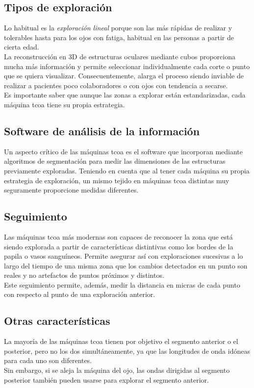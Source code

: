 \subsection{Tipos de exploración}
Lo habitual es la \emph{exploración lineal} porque son las más rápidas
de realizar y tolerables hasta para los ojos con
fatiga, habitual en las personas a partir de cierta edad.\\
La reconstrucción en 3D de estructuras oculares mediante cubos
proporciona mucha más información y permite seleccionar
individualmente cada corte o punto que se quiera
visualizar. Consecuentemente, alarga el proceso siendo inviable de
realizar a pacientes poco colaboradores o con ojos con tendencia a
secarse.\\
Es importante saber que aunque las zonas a explorar están estandarizadas, cada máquina
\gls{tcoa} tiene su propia estrategia.

\subsection{Software de análisis de la información}
Un aspecto crítico de las máquinas \gls{tcoa} es el software que
incorporan mediante algoritmos de segmentación para medir las
dimensiones de las estructuras previamente exploradas. Teniendo en
cuenta que al tener cada máquina su propia estrategia de exploración,
un mismo tejido en máquinas \gls{tcoa} distintas muy seguramente proporcione
medidas diferentes.

\subsection{Seguimiento}
Las máquinas \gls{tcoa} más modernas son capaces de reconocer la zona
que está siendo explorada a partir de características distintivas como
los bordes de la papila o vasos sanguíneos. Permite asegurar así con
exploraciones sucesivas a lo largo del tiempo de una misma zona que
los cambios detectados en un punto son reales y no artefactos de
puntos próximos y distintos.\\
Este seguimiento permite, además, medir la distancia en micras de cada
punto con respecto al punto de una exploración anterior.

\subsection{Otras características}
La mayoría de las máquinas \gls{tcoa} tienen por objetivo el segmento
anterior o el posterior, pero no los dos simultáneamente, ya que
las longitudes de onda idóneas para cada uno son diferentes.\\
Sin embargo, si se aleja la máquina del ojo, las ondas dirigidas 
al segmento posterior también pueden usarse para explorar el segmento anterior.

